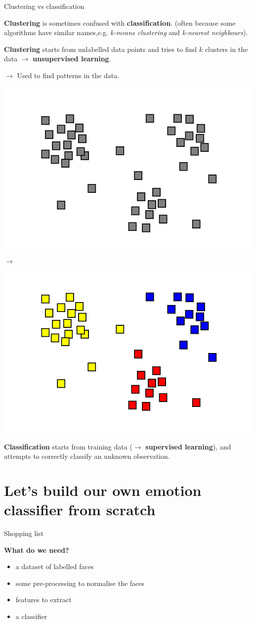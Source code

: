 \documentclass[compress]{beamer}
\begin{document}
\begin{frame}{Clustering vs classification}

\textbf{Clustering} is sometimes confused with \textbf{classification}.  (often
    because some algorithms have similar names,e.g. \emph{k-means clustering}
    and \emph{k-nearest neighbours}).

\textbf{Clustering} starts from unlabelled data points and tries to find
    $k$ clusters in the data $\rightarrow$ \textbf{unsupervised learning}.


$\rightarrow$ Used to find patterns in the data.

    \begin{center}
        \includegraphics[width=0.3\linewidth]{clustering-0}
        $\rightarrow$
        \includegraphics[width=0.3\linewidth]{clustering-1}
    \end{center}


    \textbf{Classification} starts from training data ($\rightarrow$
    \textbf{supervised learning}), and attempts to correctly classify an
    unknown observation.

\end{frame}



\section[Emotion classifier]{Let's build our own emotion classifier from scratch}

\begin{frame}{Shopping list}

    \begin{center}
        {\bf What do we need?}
    \end{center}

    \pause

    \begin{itemize}
        \item<+-> a dataset of labelled faces
        \item<+-> some pre-processing to normalise the faces
        \item<+-> features to extract
        \item<+-> a classifier
    \end{itemize}
\end{frame}
\end{document}
